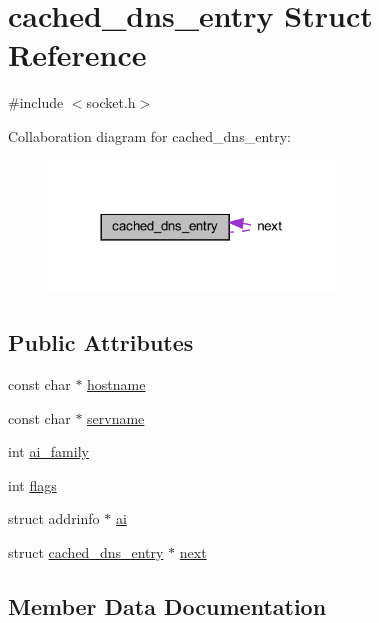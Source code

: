 \hypertarget{structcached__dns__entry}{}\section{cached\+\_\+dns\+\_\+entry Struct Reference}
\label{structcached__dns__entry}


{\ttfamily \#include $<$socket.\+h$>$}



Collaboration diagram for cached\+\_\+dns\+\_\+entry\+:
\nopagebreak
\begin{figure}[H]
\begin{center}
\leavevmode
\includegraphics[width=216pt]{structcached__dns__entry__coll__graph}
\end{center}
\end{figure}
\subsection*{Public Attributes}
\begin{DoxyCompactItemize}
\item 
const char $\ast$ \hyperlink{structcached__dns__entry_a052fed87e08c62b9af51882c1f45188d}{hostname}
\item 
const char $\ast$ \hyperlink{structcached__dns__entry_a57e20fe1ffaf4e0962cf008e13fb0dc1}{servname}
\item 
int \hyperlink{structcached__dns__entry_a47cd1861b13d948c3ebb0ba1ff4b3c01}{ai\+\_\+family}
\item 
int \hyperlink{structcached__dns__entry_a5878e9423d88197a39de9fd88209553a}{flags}
\item 
struct addrinfo $\ast$ \hyperlink{structcached__dns__entry_a8881ad4c8fb134be0f07d45e76336476}{ai}
\item 
struct \hyperlink{structcached__dns__entry}{cached\+\_\+dns\+\_\+entry} $\ast$ \hyperlink{structcached__dns__entry_a93565db3d9426f615031c51b6046d7df}{next}
\end{DoxyCompactItemize}


\subsection{Member Data Documentation}
\hypertarget{structcached__dns__entry_a8881ad4c8fb134be0f07d45e76336476}{}
